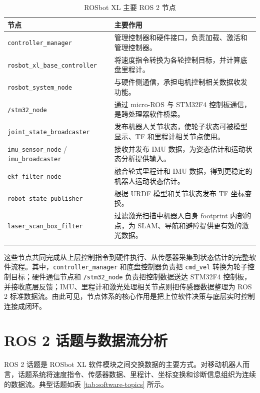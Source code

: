 \documentclass[UTF8,a4paper,12pt]{ctexrep}
\begin{document}
\begin{table}[H]
  \centering
  \caption{ROSbot XL 主要 ROS 2 节点}
  \label{tab:software-nodes}
  \small
  \begin{tabularx}{\textwidth}{L{5.6cm}Y}
    \toprule
    \textbf{节点} & \textbf{主要作用} \\
    \midrule
    \texttt{controller\_manager} & 管理控制器和硬件接口，负责加载、激活和管理控制器。 \\
    \texttt{rosbot\_xl\_base\_controller} & 将速度指令转换为各轮控制目标，并计算底盘里程计。 \\
    \texttt{rosbot\_system\_node} & 与硬件侧通信，承担电机控制相关数据收发功能。 \\
    \texttt{/stm32\_node} & 通过 micro-ROS 与 STM32F4 控制板通信，是跨处理器软件桥梁。 \\
    \texttt{joint\_state\_broadcaster} & 发布机器人关节状态，使轮子状态可被模型显示、TF 和里程计相关节点使用。 \\
    \texttt{imu\_sensor\_node} / \texttt{imu\_broadcaster} & 接收并发布 IMU 数据，为姿态估计和运动状态分析提供输入。 \\
    \texttt{ekf\_filter\_node} & 融合轮式里程计和 IMU 数据，得到更稳定的机器人运动状态估计。 \\
    \texttt{robot\_state\_publisher} & 根据 URDF 模型和关节状态发布 TF 坐标变换。 \\
    \texttt{laser\_scan\_box\_filter} & 过滤激光扫描中机器人自身 footprint 内部的点，为 SLAM、导航和避障提供更有效的激光数据。 \\
    \bottomrule
  \end{tabularx}
\end{table}

这些节点共同完成从上层控制指令到硬件执行、从传感器采集到状态估计的完整软件流程。其中，\texttt{controller\_manager} 和底盘控制器负责把 \texttt{cmd\_vel} 转换为轮子控制目标；硬件通信节点和 \texttt{/stm32\_node} 负责把控制数据送达 STM32F4 控制板，并接收底层反馈；IMU、里程计和激光处理相关节点则把传感器数据整理为 ROS 2 标准数据流。由此可见，节点体系的核心作用是把上位软件决策与底层实时控制连接成闭环。

\section{ROS 2 话题与数据流分析}

ROS 2 话题是 ROSbot XL 软件模块之间交换数据的主要方式。对移动机器人而言，话题系统将速度指令、传感器数据、里程计、坐标变换和诊断信息组织为连续的数据流。典型话题如表 \ref{tab:software-topics} 所示。
\end{document}
